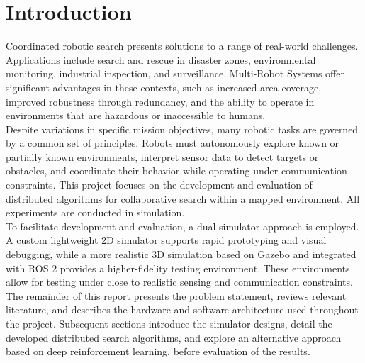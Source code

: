 \section{Introduction}
\label{sec:Introduction}
Coordinated robotic search presents solutions to a range of real-world challenges. Applications include search and rescue in disaster zones, environmental monitoring, industrial inspection, and surveillance. 
Multi-Robot Systems offer significant advantages in these contexts, such as increased area coverage, improved robustness through redundancy, and the ability to operate in environments that are hazardous or inaccessible to humans. \\

Despite variations in specific mission objectives, many robotic tasks are governed by a common set of principles. 
Robots must autonomously explore known or partially known environments, interpret sensor data to detect targets or obstacles, and coordinate their behavior while operating under communication constraints. 
This project focuses on the development and evaluation of distributed algorithms for collaborative search within a mapped environment. All experiments are conducted in simulation. \\

To facilitate development and evaluation, a dual-simulator approach is employed. 
A custom lightweight 2D simulator supports rapid prototyping and visual debugging, while a more realistic 3D simulation based on Gazebo and integrated with ROS 2 provides a higher-fidelity testing environment. These environments allow for testing under close to realistic sensing and communication constraints. \\

The remainder of this report presents the problem statement, reviews relevant literature, and describes the hardware and software architecture used throughout the project. 
Subsequent sections introduce the simulator designs, detail the developed distributed search algorithms, and explore an alternative approach based on deep reinforcement learning, before evaluation of the results.
